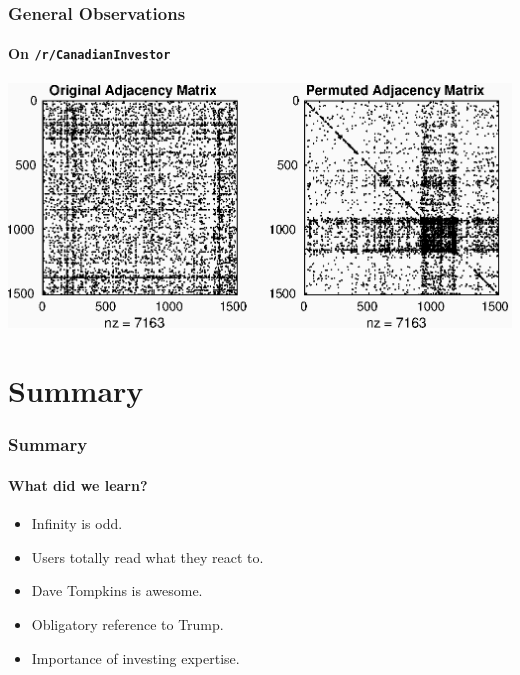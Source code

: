 \documentclass[frame number]{beamer}
\begin{document}
\begin{frame}
  \frametitle{General Observations}
  \framesubtitle{On \texttt{/r/CanadianInvestor}}
  \begin{center}
    \includegraphics[width=\textwidth]{figures/CanadianInvestor.eps}
  \end{center}
\end{frame}

\section{Summary}
\begin{frame}
  \frametitle{Summary}
  \framesubtitle{What did we learn?}
  \begin{itemize}
    \item<1->{Infinity is odd.}
    \item<2->{Users totally read what they react to.}
    \item<3->{Dave Tompkins is awesome.}
    \item<4->{Obligatory reference to Trump.}
    \item<5->{Importance of investing expertise.}
  \end{itemize}
\end{frame}
\end{document}
